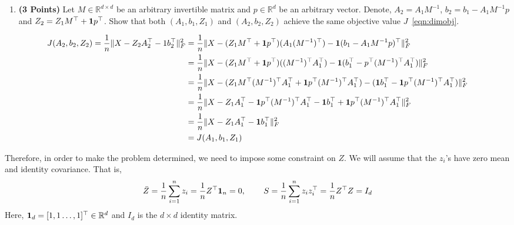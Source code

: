 \documentclass[a4paper]{article}
\newcommand*{\one}{{\bf 1}}
\newcommand{\Zbar}{\bar{Z}}
\theoremstyle{definition}
\newcommand{\RR}{\mathbb{R}}
\newenvironment{soln}{
	\leavevmode\color{blue}\ignorespaces
}{}
\begin{document}
\begin{enumerate}
\item \textbf{(3 Points)}
Let $M\in\RR^{d\times d}$ be an arbitrary invertible matrix and $p\in\RR^{d}$ be an arbitrary vector.
Denote, $A_2 = A_1M^{-1}$, $b_2 = b_1- A_1M^{-1}p$ and $Z_2 = Z_1 M^\top +
\one p^\top$.
Show that both
$(A_1, b_1, Z_1)$ and $(A_2, b_2, Z_2)$ achieve the same objective value $J$~\eqref{eqn:dimobj}.
\end{enumerate}

\begin{soln}
	$$
	\begin{aligned}
		J(A_2, b_2, Z_2) = \frac{1}{n} \| X - Z_2 A_2^\top - 1 b_2^\top \|_F^2 
		&= \frac{1}{n} \| X - (Z_1 M^\top + \one p^\top)(A_1 (M^{-1})^\top) - \one (b_1 - A_1 M^{-1} p)^\top \|_F^2 \\
		&= \frac{1}{n} \| X - (Z_1 M^\top + \one p^\top)((M^{-1})^\top A_1^\top) - \one (b_1^\top - p^\top (M^{-1})^\top A_1^\top) \|_F^2 \\
		&= \frac{1}{n} \| X - (Z_1 M^\top (M^{-1})^\top A_1^\top + \one p^\top (M^{-1})^\top A_1^\top) - (\one b_1^\top - \one p^\top (M^{-1})^\top A_1^\top) \|_F^2 \\
		&= \frac{1}{n} \| X - Z_1 A_1^\top - \one p^\top (M^{-1})^\top A_1^\top - \one b_1^\top + \one p^\top (M^{-1})^\top A_1^\top \|_F^2 \\
		&= \frac{1}{n} \| X - Z_1 A_1^\top - \one b_1^\top \|_F^2 \\
		&= J(A_1, b_1, Z_1)
	\end{aligned}
	$$
\end{soln}

Therefore, in order to make the problem determined, we need to impose some
constraint on $Z$. We will assume that the $z_i$'s have zero mean and identity covariance.
That is,
\begin{align*}
\Zbar = \frac{1}{n} \sum_{i=1}^n z_i =\frac{1}{n} Z^\top {\bf 1}_n = 0, \hspace{0.3in} 
S = \frac{1}{n} \sum_{i=1}^n z_i z_i^\top 
= \frac{1}{n} Z^\top Z
= I_d
\end{align*}
Here, ${\bf 1}_d = [1, 1 \dots, 1]^\top \in\RR^d$ and $I_d$  is the $d\times d$ identity matrix.
\end{document}
